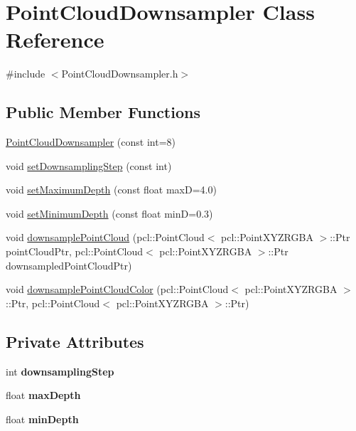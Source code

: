 \hypertarget{class_point_cloud_downsampler}{
\section{PointCloudDownsampler Class Reference}
\label{class_point_cloud_downsampler}
}


{\ttfamily \#include $<$PointCloudDownsampler.h$>$}

\subsection*{Public Member Functions}
\begin{DoxyCompactItemize}
\item 
\hyperlink{class_point_cloud_downsampler_a518e890b357eed74601e0fc940334343}{PointCloudDownsampler} (const int=8)
\item 
void \hyperlink{class_point_cloud_downsampler_aa59d5affe32288f96dd2ac1ff46aab35}{setDownsamplingStep} (const int)
\item 
void \hyperlink{class_point_cloud_downsampler_a429b93008e34b4aa7680aa44286e802c}{setMaximumDepth} (const float maxD=4.0)
\item 
void \hyperlink{class_point_cloud_downsampler_aece710727fa24542e5657f53d01906d7}{setMinimumDepth} (const float minD=0.3)
\item 
void \hyperlink{class_point_cloud_downsampler_a6c2648119f30b8c41c5851844c1acb29}{downsamplePointCloud} (pcl::PointCloud$<$ pcl::PointXYZRGBA $>$::Ptr pointCloudPtr, pcl::PointCloud$<$ pcl::PointXYZRGBA $>$::Ptr downsampledPointCloudPtr)
\item 
void \hyperlink{class_point_cloud_downsampler_aa974584d15d1de898bbec8dbf791b29f}{downsamplePointCloudColor} (pcl::PointCloud$<$ pcl::PointXYZRGBA $>$::Ptr, pcl::PointCloud$<$ pcl::PointXYZRGBA $>$::Ptr)
\end{DoxyCompactItemize}
\subsection*{Private Attributes}
\begin{DoxyCompactItemize}
\item 
\hypertarget{class_point_cloud_downsampler_a74b48c9180a5d63ab550e26f07c24df0}{
int {\bfseries downsamplingStep}}
\label{class_point_cloud_downsampler_a74b48c9180a5d63ab550e26f07c24df0}

\item 
\hypertarget{class_point_cloud_downsampler_ae0c137dfabde9694984a0d4fa87e3b36}{
float {\bfseries maxDepth}}
\label{class_point_cloud_downsampler_ae0c137dfabde9694984a0d4fa87e3b36}

\item 
\hypertarget{class_point_cloud_downsampler_a297e75764bca40b3ecc32db5cdb03379}{
float {\bfseries minDepth}}
\label{class_point_cloud_downsampler_a297e75764bca40b3ecc32db5cdb03379}

\end{DoxyCompactItemize}


